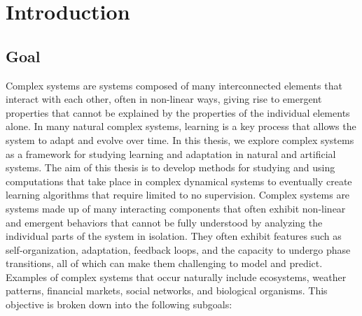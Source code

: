 \chapter{Introduction}
\label{cha:introduction}

\section{Goal}

Complex systems are systems composed of many interconnected elements that 
interact with each other, often in non-linear ways, giving rise to emergent 
properties that cannot be explained by the properties of the individual 
elements alone. In many natural complex systems, learning is a key process that 
allows the system to adapt and evolve over time. 
In this thesis, we explore complex systems
as a framework for studying learning and adaptation in natural and artificial
systems. The aim of this thesis is to develop methods for studying and using
computations that take place in complex dynamical systems to eventually create
learning algorithms that require limited to no supervision. 
Complex systems are systems made up of many interacting components that often 
exhibit non-linear and emergent behaviors that cannot be fully understood by 
analyzing the individual parts of the system in isolation. They often exhibit 
features such as self-organization, adaptation, feedback loops, and the capacity
to undergo phase transitions, all of which can make them challenging to model and 
predict. Examples of complex systems that occur naturally include ecosystems, weather patterns, financial 
markets, social networks, and biological organisms.
This objective is broken down into the following subgoals:

